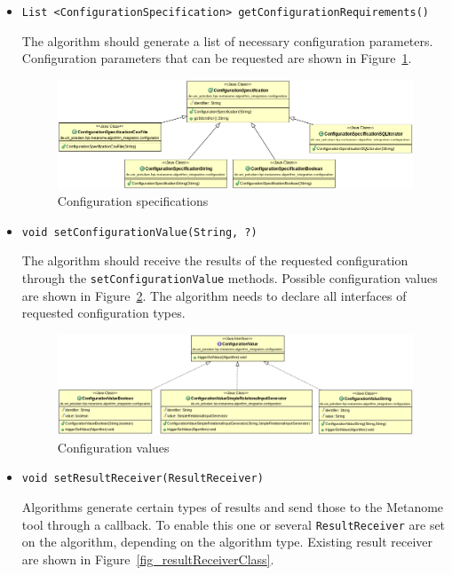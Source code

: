 \documentclass[10pt,a4paper]{article}
\begin{document}
\begin{itemize}
\item \texttt{List <ConfigurationSpecification> getConfigurationRequirements()}

The algorithm should generate a list of necessary configuration parameters. Configuration parameters that can be requested are shown in Figure~\ref{fig_configurationSpecificationClass}.

\begin{figure}[h]
\includegraphics[width=\textwidth]{configurationSpecification_class}
\caption{Configuration specifications}
\label{fig_configurationSpecificationClass}
\end{figure}

\item \texttt{void setConfigurationValue(String, ?)}

The algorithm should receive the results of the requested configuration through the \texttt{setConfigurationValue} methods. Possible configuration values are shown in Figure~\ref{fig_configurationValueClass}. The algorithm needs to declare all interfaces of requested configuration types.

\begin{figure}[h]
\includegraphics[width=\textwidth]{configurationValue_class}
\caption{Configuration values}
\label{fig_configurationValueClass}
\end{figure}

\item \texttt{void setResultReceiver(ResultReceiver)}

Algorithms generate certain types of results and send those to the Metanome tool through a callback. To enable this one or several \texttt{ResultReceiver} are set on the algorithm, depending on the algorithm type. Existing result receiver are shown in Figure~\ref{fig_resultReceiverClass}.


\end{itemize}
\end{document}
